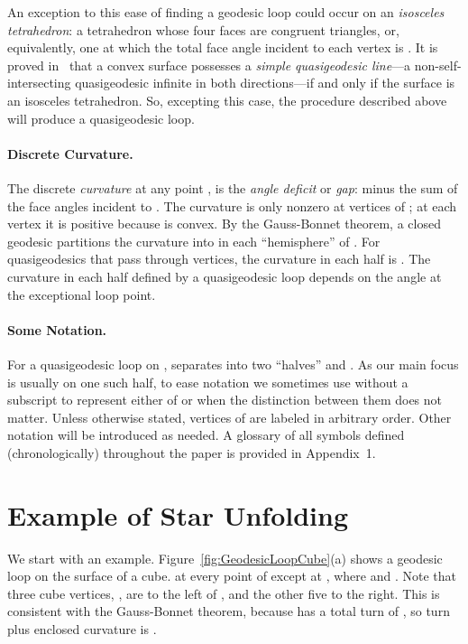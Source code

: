 \pdfoutput=1  \documentclass[]{article}
\newcommand{\seclab}[1]{\label{sec:#1}}
\newcommand{\figref}[1]{\ref{fig:#1}}
\begin{document}
An exception to this ease of finding a geodesic loop could
occur on an \emph{isosceles tetrahedron}: a tetrahedron
whose four faces are congruent triangles, or, equivalently,
one at which the total face angle incident to each vertex is .
It is proved in~\cite{iv-gcit-08} that a convex surface possesses
a \emph{simple quasigeodesic line}---a
non-self-intersecting quasigeodesic infinite in both directions---if
and only if the surface is an isosceles tetrahedron.
So, excepting this case, the procedure described above will produce a
quasigeodesic loop.





\paragraph{Discrete Curvature.}
The discrete \emph{curvature}  at any point ,
is the \emph{angle deficit}
or \emph{gap}:  minus the sum of the face angles incident to .
The curvature is only nonzero at vertices of ;
at each vertex it is positive because  is convex.
By the Gauss-Bonnet theorem, a closed geodesic partitions the
curvature into  in each ``hemisphere'' of .
For quasigeodesics that pass through vertices, the curvature in each
half is .
The curvature in each half defined by a quasigeodesic loop depends on the
angle at the exceptional loop point.


\paragraph{Some Notation.}
For a quasigeodesic loop  on ,
 separates  into two ``halves''
 and .
As our main focus is usually on one such half, 
to ease notation we sometimes use  without a subscript
to represent either of  or 
when the distinction between them does not matter.
Unless otherwise stated,
vertices of  are labeled  in arbitrary order.
Other notation will be introduced as needed.
A glossary of all symbols defined (chronologically) 
throughout the paper is provided in Appendix~1.



\section{Example of Star Unfolding}
\seclab{Example}
We start with an example.
Figure~\figref{GeodesicLoopCube}(a) shows a geodesic loop
 on the surface  of a cube.
 at every point  of  except at
, where  and  .
Note that three cube vertices, , are to the left
of , and the other five to the right.
This is consistent with the Gauss-Bonnet theorem, because
 has a total turn of ,
so turn plus enclosed curvature is .
\end{document}
